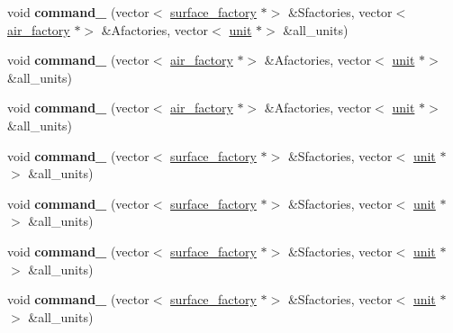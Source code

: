 \begin{DoxyCompactItemize}
void {\bfseries command\+\_} (vector$<$ \mbox{\hyperlink{classsurface__factory}{surface\+\_\+factory}} $\ast$$>$ \&Sfactories, vector$<$ \mbox{\hyperlink{classair__factory}{air\+\_\+factory}} $\ast$$>$ \&Afactories, vector$<$ \mbox{\hyperlink{classunit}{unit}} $\ast$$>$ \&all\+\_\+units)
\item 
\mbox{\label{classadapter__main_a77423543efa05c11933e5b0d875a4b6c}} 
void {\bfseries command\+\_} (vector$<$ \mbox{\hyperlink{classair__factory}{air\+\_\+factory}} $\ast$$>$ \&Afactories, vector$<$ \mbox{\hyperlink{classunit}{unit}} $\ast$$>$ \&all\+\_\+units)
\item 
\mbox{\label{classadapter__main_ac3a91adc49991daa61158acb2168b878}} 
void {\bfseries command\+\_} (vector$<$ \mbox{\hyperlink{classair__factory}{air\+\_\+factory}} $\ast$$>$ \&Afactories, vector$<$ \mbox{\hyperlink{classunit}{unit}} $\ast$$>$ \&all\+\_\+units)
\item 
\mbox{\label{classadapter__main_a9d8044405df39139ae184efef7de2191}} 
void {\bfseries command\+\_} (vector$<$ \mbox{\hyperlink{classsurface__factory}{surface\+\_\+factory}} $\ast$$>$ \&Sfactories, vector$<$ \mbox{\hyperlink{classunit}{unit}} $\ast$$>$ \&all\+\_\+units)
\item 
\mbox{\label{classadapter__main_a4d7bfb9279532feae4bc5c62ebaf64d8}} 
void {\bfseries command\+\_} (vector$<$ \mbox{\hyperlink{classsurface__factory}{surface\+\_\+factory}} $\ast$$>$ \&Sfactories, vector$<$ \mbox{\hyperlink{classunit}{unit}} $\ast$$>$ \&all\+\_\+units)
\item 
\mbox{\label{classadapter__main_ad1b6c982fb262c96ebde255f719406ec}} 
void {\bfseries command\+\_} (vector$<$ \mbox{\hyperlink{classsurface__factory}{surface\+\_\+factory}} $\ast$$>$ \&Sfactories, vector$<$ \mbox{\hyperlink{classunit}{unit}} $\ast$$>$ \&all\+\_\+units)
\item 
\mbox{\label{classadapter__main_aaade1c0478b17e9a459c1ff2376a084e}} 
void {\bfseries command\+\_} (vector$<$ \mbox{\hyperlink{classsurface__factory}{surface\+\_\+factory}} $\ast$$>$ \&Sfactories, vector$<$ \mbox{\hyperlink{classunit}{unit}} $\ast$$>$ \&all\+\_\+units)
\item 
$$
\end{DoxyCompactItemize}
